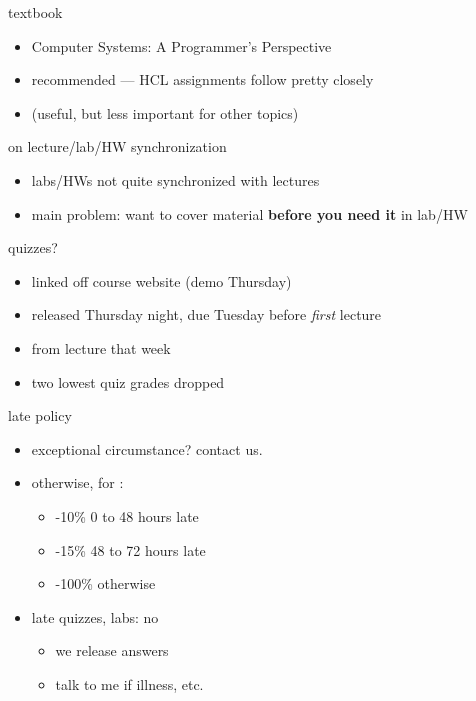 \begin{frame}{textbook}
    \begin{itemize}
    \item Computer Systems: A Programmer's Perspective
    \item recommended --- HCL assignments follow pretty closely
    \item (useful, but less important for other topics)
    \end{itemize}
\end{frame}

\begin{frame}{on lecture/lab/HW synchronization}
    \begin{itemize}
        \item labs/HWs not quite synchronized with lectures
        \item main problem: want to cover material \textbf{before you need it} in lab/HW
    \end{itemize}
\end{frame}


\begin{frame}{quizzes?}
    \begin{itemize}
    \item linked off course website (demo Thursday)
    \item released Thursday night, due Tuesday before \textit{first} lecture
    \item from lecture that week
    \vspace{.5cm}
    \item two lowest quiz grades dropped
    \end{itemize}
\end{frame}

\begin{frame}{late policy}
    \begin{itemize}
    \item exceptional circumstance? contact us.
    \item otherwise, for :
        \begin{itemize}
        \item -10\% 0 to 48 hours late
        \item -15\% 48 to 72 hours late
        \item -100\% otherwise
        \end{itemize}
    \item late quizzes, labs: no
        \begin{itemize}
        \item we release answers
        \item talk to me if illness, etc.
        \end{itemize}
    \end{itemize}
\end{frame}

